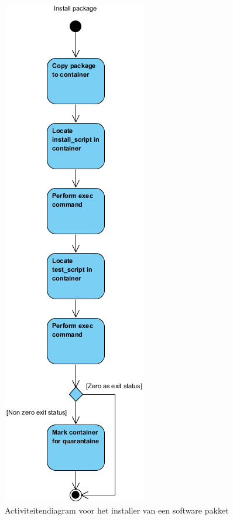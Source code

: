 \begin{figure}[!ht]
\centering
\includegraphics[scale=0.9]{afbeelding/flowcharts/installPackage.png}
\caption{Activiteitendiagram voor het installer van een software pakket}
\label{fig:flow:installPackage}
\end{figure}

%
%
%
